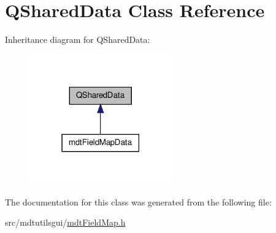 \hypertarget{class_q_shared_data}{\section{Q\-Shared\-Data Class Reference}
\label{class_q_shared_data}
}


Inheritance diagram for Q\-Shared\-Data\-:\nopagebreak
\begin{figure}[H]
\begin{center}
\leavevmode
\includegraphics[width=174pt]{class_q_shared_data__inherit__graph}
\end{center}
\end{figure}


The documentation for this class was generated from the following file\-:\begin{DoxyCompactItemize}
\item 
src/mdtutilsgui/\hyperlink{mdt_field_map_8h}{mdt\-Field\-Map.\-h}\end{DoxyCompactItemize}
